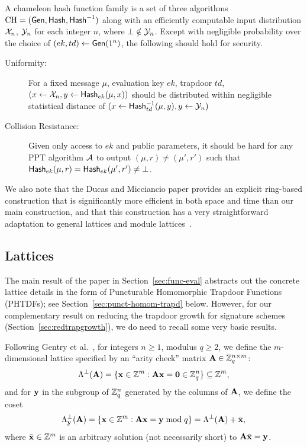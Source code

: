 \begin{definition}A chameleon hash function family is a set of three algorithms
  $\text{CH}=(\mathsf{Gen},\mathsf{Hash},\mathsf{Hash}^{-1})$ along with an efficiently computable
  input distribution $\mathcal{X}_n$, $\mathcal{Y}_n$ for each integer $n$, where
  $\bot \notin \mathcal{Y}_n$. Except with negligible probability over the
  choice of $(ek,td) \gets \mathsf{Gen}(1^n)$, the following should hold for
  security.
\begin{description}
\item[Uniformity:] For a fixed message $\mu$, evaluation key $ek$,
  trapdoor $td$, 
  $(x \gets \mathcal{X}_{n}, y \gets \mathsf{Hash}_{ek}(\mu,x))$ should be
  distributed within negligible statistical distance of $(x \gets
  \mathsf{Hash}^{-1}_{td}(\mu,y), y \gets \mathcal{Y}_{n})$
\item[Collision Resistance:] Given only access to $ek$ and public
  parameters, it should be hard for any PPT algorithm $\mathcal{A}$ to
  output $(\mu,r) \neq (\mu',r')$ such that
  $\mathsf{Hash}_{ek}(\mu,r)=\mathsf{Hash}_{ek}(\mu',r') \neq \bot$. 
\end{description}
\end{definition}

We also note that the Ducas and Micciancio paper provides an explicit
ring-based construction that is significantly more efficient in both
space and time than our main construction, and that this construction
has a very straightforward adaptation to general lattices and module lattices~\cite{DBLP:journals/dcc/LangloisS15}.


\subsection{Lattices}
\label{subsec:gaussians_lattices}

The main result of the paper in Section~\ref{sec:func-eval}
abstracts out the concrete lattice details in the form of Puncturable
Homomorphic Trapdoor Functions (PHTDFs); see
Section~\ref{sec:punct-homom-trapd} below. However, for our
complementary result on reducing the trapdoor growth for signature schemes
(Section~\ref{sec:redtrapgrowth}), we do need to recall some very basic results.

Following Gentry et al.~\cite{DBLP:conf/stoc/GentryPV08}, for integers $n
\geq 1$, modulus $q \geq 2$, we define the $m$-dimensional lattice specified by an ``arity check'' matrix $\mathbf{A} \in \mathbb{Z}_q^{n
  \times m}$:
\[\Lambda^{\perp}(\mathbf{A}) = \{ \mathbf{x} \in \mathbb{Z}^m: \mathbf{A}\mathbf{x} = \mathbf{0}
  \in \mathbb{Z}_q^{n} \} \subseteq \mathbb{Z}^m,\]and for $\mathbf{y}$ in the subgroup of
$\mathbb{Z}_q^{n}$ generated by the columns of $\mathbf{A}$, we define the
coset
\[\Lambda_{\mathbf{y}}^{\perp}(\mathbf{A}) = \{ \mathbf{x} \in \mathbb{Z}^m: \mathbf{A}\mathbf{x} =
  \mathbf{y} \bmod q\} = \Lambda^{\perp}(\mathbf{A})+\bar{\mathbf{x}},\]
  where
 $\bar{\mathbf{x}} \in \mathbb{Z}^m$ is an arbitrary solution (not necessarily
 short) to
 $\mathbf{A}\bar{\mathbf{x}}=\mathbf{y}$.

